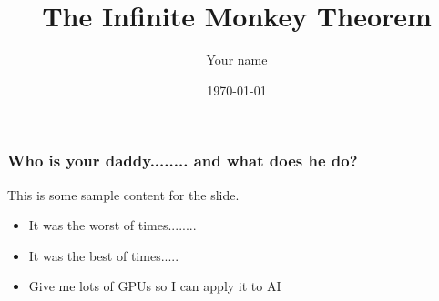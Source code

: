 \documentclass{beamer}
\title{The Infinite Monkey Theorem}
\author{Your name}
\date{\today}
\begin{document}
    \frame{\titlepage}

    \begin{frame}
        \frametitle{Who is your daddy........ and what does he do?}
        This is some sample content for the slide.
        \begin{itemize}
            \item It was the worst of times........
            \item It was the best of times.....
            \item Give me lots of GPUs so I can apply it to AI
        \end{itemize}
    \end{frame}
\end{document}
